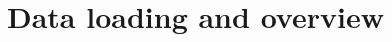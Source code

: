 \documentclass[
 size=14pt,
 paper=smartboard,  %
 mode=present, 		%
 display=slides, 	%
 style=tuliplab,  	%
 pauseslide,
 fleqn,leqno]{powerdot}
\begin{document}
%
%
%
%
%
%


\section{Data loading and overview}
\end{document}
